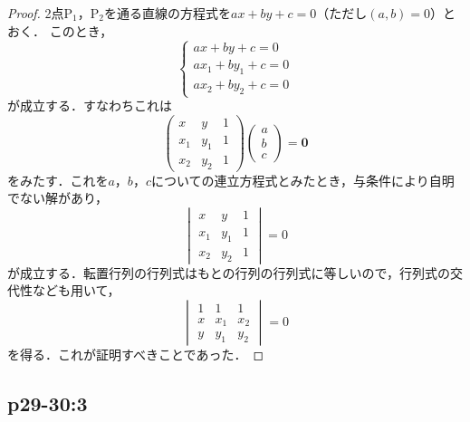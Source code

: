 \documentclass[uplatex,dvipdfmx,a4paper,10pt,fleqn]{jsarticle}
\begin{document}
\begin{tleftbar}
    \begin{proof}
    2点$\mathrm{P}_1$，$\mathrm{P_2}$を通る直線の方程式を$ax+by+c=0$（ただし$(a,b)=0$）とおく．
    このとき，
    \[
        \begin{cases}
            ax+by+c =0 \\
            ax_1 + by_1 +c=0 \\
            ax_2 + by_2 +c =0
        \end{cases}
    \]
    が成立する．すなわちこれは
    \[
        \begin{pmatrix} 
            x & y & 1 \\
            x_1 & y_1 & 1 \\
            x_2 & y_2 & 1 
        \end{pmatrix}
        \begin{pmatrix}
            a \\
            b \\
            c
        \end{pmatrix}
        = \bm{0}
    \]
    をみたす．これを$a$，$b$，$c$についての連立方程式とみたとき，与条件により自明でない解があり，
    \[
    \begin{vmatrix} 
        x & y & 1 \\
        x_1 & y_1 & 1 \\
        x_2 & y_2 & 1 
    \end{vmatrix}
    =0
    \]
    が成立する．転置行列の行列式はもとの行列の行列式に等しいので，行列式の交代性なども用いて，
    \[ 
    \begin{vmatrix} 
        1 & 1 & 1 \\
        x & x_1 & x_2 \\
        y & y_1 & y_2 
    \end{vmatrix}
    =0
    \]
を得る．これが証明すべきことであった．
\end{proof}
\end{tleftbar}



\subsection*{p29-30:3}
\end{document}
